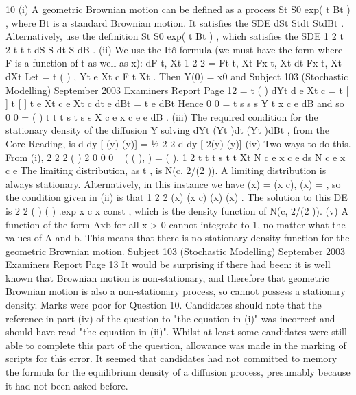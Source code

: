 \documentclass[a4paper,12pt]{article}
\begin{document}
10 (i) A geometric Brownian motion can be defined as a process
St S0 exp( t Bt ) , where Bt is a standard Brownian motion.
It satisfies the SDE dSt Stdt StdBt .
Alternatively, use the definition St S0 exp( t Bt ) , which satisfies the SDE
1 2
t 2 t t t dS S dt S dB .
(ii) We use the Itô formula (we must have the form where F is a function of t as
well as x):
dF t, Xt 1 2
2 = Ft t, Xt Fx t, Xt dt Fx t, Xt dXt
Let = t ( ) ,
Yt e Xt c F t Xt . Then Y(0) = x0 and
Subject 103 (Stochastic Modelling) September 2003 Examiners Report
Page 12
= t ( )
dYt d e Xt c
= t [ ] t [ ] t
e Xt c e Xt c dt e dBt
= t
e dBt
Hence 0
0
=
t
s
s
s
Y t x c e dB
and so 0
0
= ( )
t
t t s
t s
s
X c e x c e e dB .
(iii) The required condition for the stationary density of the diffusion Y solving
dYt (Yt )dt (Yt )dBt , from the Core Reading, is
d
dy
[ (y) (y)] = ½
2
2
d
dy
[ 2(y) (y)]
(iv) Two ways to do this. From (i),
2
2 2 ( ) 2
0 0 0
~ ( ( ), ) = ( ), 1
2
t t t s t t
Xt N c e x c e ds N c e x c e
The limiting distribution, as t , is N(c, 2/(2 )). A limiting distribution is
always stationary.
Alternatively, in this instance we have (x) = (x c), (x) = , so the
condition given in (ii) is that
1 2
2
(x) (x c) (x) (x) .
The solution to this DE is
2
2
( )
( ) .exp
x c
x const ,
which is the density function of N(c, 2/(2 )).
(v) A function of the form Axb for all x > 0 cannot integrate to 1, no matter what
the values of A and b. This means that there is no stationary density function
for the geometric Brownian motion.
Subject 103 (Stochastic Modelling) September 2003 Examiners Report
Page 13
It would be surprising if there had been: it is well known that Brownian
motion is non-stationary, and therefore that geometric Brownian motion is
also a non-stationary process, so cannot possess a stationary density.
Marks were poor for Question 10. Candidates should note that the reference in part (iv) of the
question to "the equation in (i)" was incorrect and should have read "the equation in (ii)". Whilst at
least some candidates were still able to complete this part of the question, allowance was made in the
marking of scripts for this error.
It seemed that candidates had not committed to memory the formula for the equilibrium density of a
diffusion process, presumably because it had not been asked before.
\end{document}
